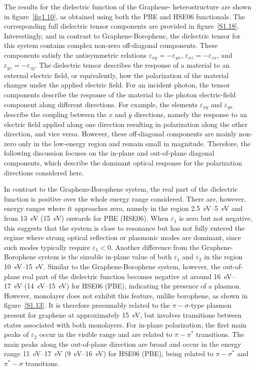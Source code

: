 The results for the dielectric function of the Graphene- heterostructure are shown in figure~\ref{fig1.10},
as obtained using both the PBE and HSE06 functionals.
The corresponding full dielectric tensor components are provided in figure~\ref{S1.18}.
Interestingly, and in contrast to Graphene-Borophene,
the dielectric tensor for this system contains complex non-zero off-diagonal components.
These components satisfy the antisymmetric relations
$\varepsilon_{xy}=-\varepsilon_{yx}$,
$\varepsilon_{xz}=-\varepsilon_{zx}$,
and $\varepsilon_{yz}=-\varepsilon_{zy}$.
The dielectric tensor describes the response of a material to an external electric field,
or equivalently, how the polarization of the material changes under the applied electric field.
For an incident photon,
the tensor components describe the response of the material to the photon electric-field component along different directions.
For example, the elements $\varepsilon_{xy}$ and $\varepsilon_{yx}$ describe the coupling between the $x$ and $y$ directions,
namely the response to an electric field applied along one direction resulting in polarization along the other direction, and vice versa.
However, these off-diagonal components are mainly non-zero only in the low-energy region and remain small in magnitude.
Therefore, the following discussion focuses on the in-plane and out-of-plane diagonal components,
which describe the dominant optical response for the polarization directions considered here.

In contrast to the Graphene-Borophene system,
the real part of the dielectric function is positive over the whole energy range considered.
There are, however, energy ranges where it approaches zero,
namely in the region \qtyrange{2.5}{5}{\electronvolt} and from \qty{13}{\electronvolt} (\qty{15}{\electronvolt}) onwards for PBE (HSE06).
When $\varepsilon_1$ is zero but not negative,
this suggests that the system is close to resonance but has not fully entered the regime where strong optical reflection or plasmonic modes are dominant,
since such modes typically require $\varepsilon_1 < 0$.
Another difference from the Graphene-Borophene system is the sizeable in-plane value of both $\varepsilon_1$ and $\varepsilon_2$ in the region \qtyrange{10}{15}{\electronvolt}.
Similar to the Graphene-Borophene system, however,
the out-of-plane real part of the dielectric function becomes negative at around \qtyrange{16}{17}{\electronvolt} (\qtyrange{14}{15}{\electronvolt}) for HSE06 (PBE),
indicating the presence of a plasmon.
However, monolayer  does not exhibit this feature, unlike borophene, as shown in figure~\ref{S1.13}.
It is therefore presumably related to the $\pi-\sigma$-type plasmon present for graphene at approximately \qty{15}{\electronvolt},
but involves transitions between states associated with both monolayers.
For in-plane polarization, the first main peaks of $\varepsilon_2$ occur in the visible range and are related to $\pi-\pi^*$ transitions.
The main peaks along the out-of-plane direction are broad and occur in the energy range \qtyrange{11}{17}{\electronvolt} (\qtyrange{9}{16}{\electronvolt}) for HSE06 (PBE),
being related to $\pi-\sigma^*$ and $\pi^*-\sigma$ transitions.

